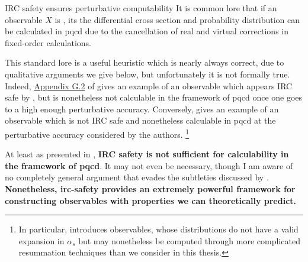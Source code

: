 


\begin{lore}{IRC safety ensures perturbative computability}{}
    It is common lore that if an observable \(X\) is , its the differential cross section and probability distribution can be calculated in \gls{pqcd} due to the cancellation of real and virtual corrections in fixed-order calculations.
\end{lore}

    This standard lore is a useful heuristic which is nearly always correct, due to qualitative arguments we give below, but unfortunately it is not formally true.
    Indeed, \href{https://arxiv.org/pdf/hep-ph/0407286\#page=94}{Appendix G.2} of  gives an example of an observable which appears IRC safe by , but is nonetheless not calculable in the framework of \gls{pqcd} once one goes to a high enough perturbative accuracy.
    Conversely,  gives an example of an observable which is not IRC safe and nonetheless calculable in \gls{pqcd} at the perturbative accuracy considered by the authors.%
    \footnote{
        In particular,  introduces  observables, whose distributions do not have a valid expansion in \(\alpha_s\) but may nonetheless be computed through more complicated resummation techniques than we consider in this thesis.
    }

    At least as presented in , \textbf{IRC safety is not sufficient for calculability in the framework of \gls{pqcd}}.
    It may not even be necessary, though I am aware of no  completely general argument that evades the subtleties discussed by .
    \textbf{Nonetheless, \gls{irc-safety} provides an extremely powerful framework for constructing observables with properties we can theoretically predict.}


